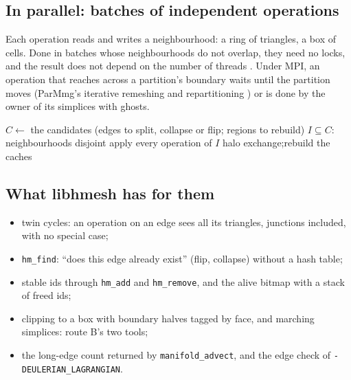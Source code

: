 \documentclass[10pt,a4paper]{article}
\theoremstyle{definition}
\newcommand{\fn}[1]{\texttt{#1}}
\begin{document}
\subsection{In parallel: batches of independent operations}
\label{sec:topo-parallel}

Each operation reads and writes a neighbourhood: a ring of triangles, a box
of cells. Done in batches whose neighbourhoods do not overlap, they need no
locks, and the result does not depend on the number of threads
\cite{rokos}. Under MPI, an operation that reaches across a partition's
boundary waits until the partition moves (ParMmg's iterative remeshing and
repartitioning \cite{parmmg}) or is done by the owner of its simplices with
ghosts.

\begin{algorithm}[H]
  \caption{\textsc{Batch} \cite{rokos, parmmg}}
  \label{alg:batch}
  \begin{algorithmic}[1]
    \Repeat
      \State $C \gets$ the candidates (edges to split, collapse or flip;
        regions to rebuild)
      \State $I \subseteq C$: neighbourhoods disjoint 
      \State apply every operation of $I$ 
      \State halo exchange;\quad rebuild the caches
  \end{algorithmic}
\end{algorithm}

\subsection{What libhmesh has for them}

\begin{itemize}
  \item twin cycles: an operation on an edge sees all its triangles,
    junctions included, with no special case;
  \item \fn{hm\_find}: ``does this edge already exist'' (flip, collapse)
    without a hash table;
  \item stable ids through \fn{hm\_add} and \fn{hm\_remove}, and the alive
    bitmap with a stack of freed ids;
  \item clipping to a box with boundary halves tagged by face, and
    marching simplices: route B's two tools;
  \item the long-edge count returned by \fn{manifold\_advect}, and the edge
    check of \fn{-DEULERIAN\_LAGRANGIAN}.
\end{itemize}
\end{document}
